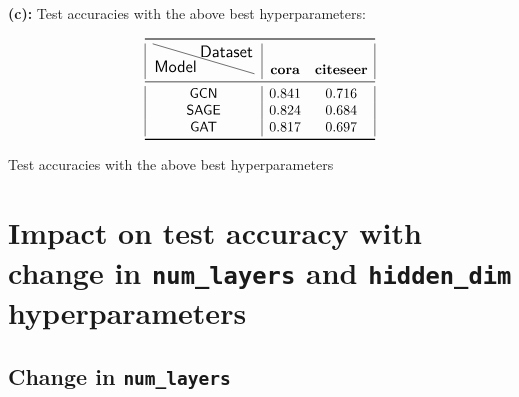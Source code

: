\documentclass[11pt]{article}
\begin{document}
    \textbf{(c): } Test accuracies with the above best hyperparameters:%
\vspace{-0.4cm}
    \begin{table}[H]
        \centering
        \[\begin{array}{|c|cc|}
        \toprule
            \tikz{\node[below left, inner sep=1pt] (def) {\large \sf Model};%
                \node[above right,inner sep=1pt] (abc) {\large \sf Dataset};%
                \draw (def.north west|-abc.north west) -- (def.south east-|abc.south east);}
            & {\sf \textbf{cora}} & {\sf \textbf{citeseer}}\\
        \midrule
            {\sf GCN}  & 0.841 & 0.716 \\
            {\sf SAGE} & 0.824 & 0.684 \\
            {\sf GAT}  & 0.817 & 0.697 \\
        \bottomrule
        \end{array}\]
        \caption{Test accuracies with the above best hyperparameters}
    \end{table}
    
    
    \section{Impact on test accuracy with change in \texttt{num\_layers} and \texttt{hidden\_dim} hyperparameters}
    
    \subsection{Change in \texttt{num\_layers}}
    
\end{document}
